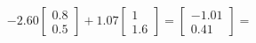 \documentclass[preview]{standalone}
\begin{document}
\begin{align*}
-2.60 \begin{bmatrix} 0.8 \\ 0.5 \end{bmatrix} + 1.07 \begin{bmatrix} 1 \\ 1.6 \end{bmatrix} = \begin{bmatrix} -1.01 \\ 0.41 \end{bmatrix} =
\end{align*}
\end{document}
